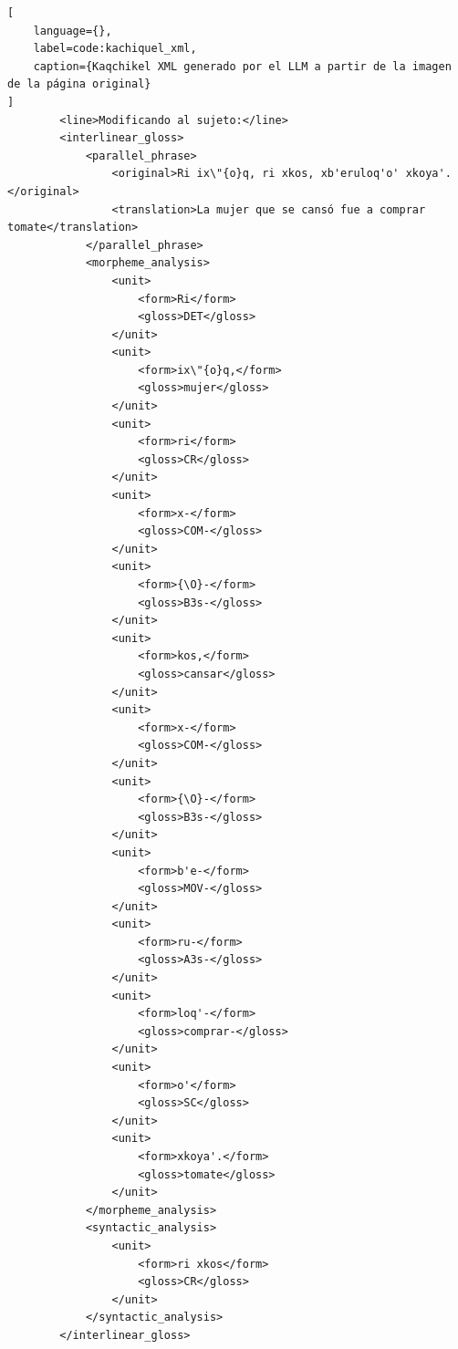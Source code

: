 \begin{lstlisting}[
    language={},
    label=code:kachiquel_xml,
    caption={Kaqchikel XML generado por el LLM a partir de la imagen de la página original}
]
        <line>Modificando al sujeto:</line>
        <interlinear_gloss>
            <parallel_phrase>
                <original>Ri ix\"{o}q, ri xkos, xb'eruloq'o' xkoya'.</original>
                <translation>La mujer que se cansó fue a comprar tomate</translation>
            </parallel_phrase>
            <morpheme_analysis>
                <unit>
                    <form>Ri</form>
                    <gloss>DET</gloss>
                </unit>
                <unit>
                    <form>ix\"{o}q,</form>
                    <gloss>mujer</gloss>
                </unit>
                <unit>
                    <form>ri</form>
                    <gloss>CR</gloss>
                </unit>
                <unit>
                    <form>x-</form>
                    <gloss>COM-</gloss>
                </unit>
                <unit>
                    <form>{\O}-</form>
                    <gloss>B3s-</gloss>
                </unit>
                <unit>
                    <form>kos,</form>
                    <gloss>cansar</gloss>
                </unit>
                <unit>
                    <form>x-</form>
                    <gloss>COM-</gloss>
                </unit>
                <unit>
                    <form>{\O}-</form>
                    <gloss>B3s-</gloss>
                </unit>
                <unit>
                    <form>b'e-</form>
                    <gloss>MOV-</gloss>
                </unit>
                <unit>
                    <form>ru-</form>
                    <gloss>A3s-</gloss>
                </unit>
                <unit>
                    <form>loq'-</form>
                    <gloss>comprar-</gloss>
                </unit>
                <unit>
                    <form>o'</form>
                    <gloss>SC</gloss>
                </unit>
                <unit>
                    <form>xkoya'.</form>
                    <gloss>tomate</gloss>
                </unit>
            </morpheme_analysis>
            <syntactic_analysis>
                <unit>
                    <form>ri xkos</form>
                    <gloss>CR</gloss>
                </unit>
            </syntactic_analysis>
        </interlinear_gloss>



\end{lstlisting}
